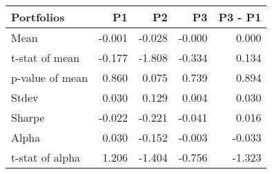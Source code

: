 \begin{tabular}{lrrrr}
\toprule
Portfolios & P1 & P2 & P3 & P3 - P1 \\
\midrule
Mean & -0.001 & -0.028 & -0.000 & 0.000 \\
t-stat of mean & -0.177 & -1.808 & -0.334 & 0.134 \\
p-value of mean & 0.860 & 0.075 & 0.739 & 0.894 \\
Stdev & 0.030 & 0.129 & 0.004 & 0.030 \\
Sharpe & -0.022 & -0.221 & -0.041 & 0.016 \\
Alpha & 0.030 & -0.152 & -0.003 & -0.033 \\
t-stat of alpha & 1.206 & -1.404 & -0.756 & -1.323 \\
\bottomrule
\end{tabular}
